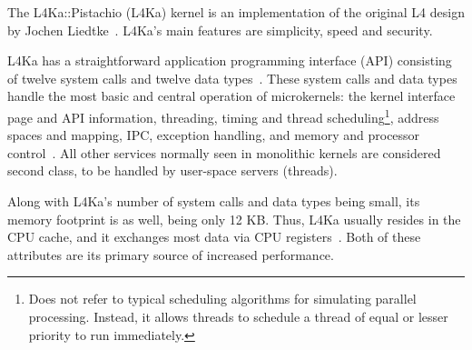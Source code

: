 The L4Ka::Pistachio (L4Ka) kernel is an implementation of the original
L4 design by Jochen Liedtke~\cite{herder2005}.  L4Ka's main features are
simplicity, speed and security.

L4Ka has a straightforward application programming interface (API)
consisting of twelve system calls and twelve data types~\cite{l4ref2005}.
These system calls and data types handle the most
basic and central operation of microkernels: the kernel interface page
and API information, threading, timing and thread
scheduling\footnote{Does not refer to typical scheduling algorithms for
simulating parallel processing.  Instead, it allows threads to schedule a
thread of equal or lesser priority to run immediately.}, address
spaces and mapping, IPC, exception handling, and memory and processor
control~\cite{l4ref2005}.  All other services normally seen in monolithic
kernels are considered second class, to be handled by user-space
servers (threads).

Along with L4Ka's number of system calls and data types being small, its
memory footprint is as well, being only 12 KB.  Thus, L4Ka usually
resides in the CPU cache, and it exchanges most data via CPU
registers~\cite{l4ref2005}.  Both of these attributes are its primary source
of increased performance.
